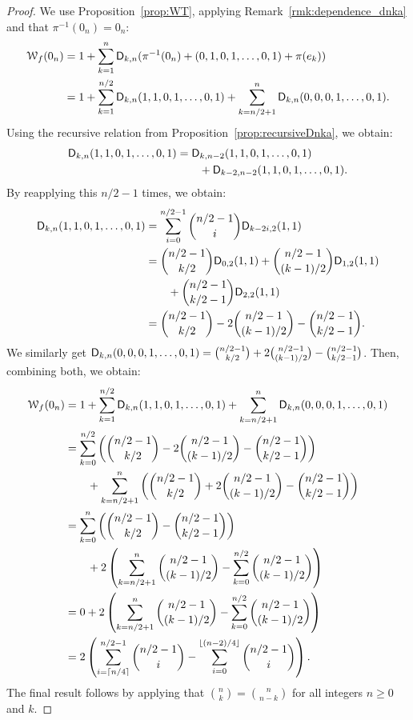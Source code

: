 \documentclass{llncs}
\begin{document}
\begin{proof}
	We use Proposition~\ref{prop:WT}, applying Remark~\ref{rmk:dependence_dnka} and that $\pi^{-1}(0_n)=0_n$:
	\begin{align*}
		\wt{f}(0_n)&=1+\sum_{k=1}^n\Dnka{n}{k}{\pi^{-1}(0_n)+(0,1,0,1,\ldots,0,1)+\pi(e_k)}\\
		&=1+\sum_{k=1}^{n/2}\Dnka{n}{k}{1,1,0,1,\ldots,0,1}+\sum_{k=n/2+1}^{n}\Dnka{n}{k}{0,0,0,1,\ldots,0,1}.
	\end{align*}
	Using the recursive relation from Proposition~\ref{prop:recursiveDnka}, we obtain:
	\begin{align*}
		\Dnka{n}{k}{1,1,0,1,\ldots,0,1}&=\Dnka{n-2}{k}{1,1,0,1,\ldots,0,1}\\
		&\qquad+\Dnka{n-2}{k-2}{1,1,0,1,\ldots,0,1}.
	\end{align*}
	By reapplying this $n/2-1$ times, we obtain:
	\begin{align*}
		\Dnka{n}{k}{1,1,0,1,\ldots,0,1}&=\sum_{i=0}^{n/2-1} \binom{n/2-1}{i} \Dnka{2}{k-2i}{1,1}\\
		&=\binom{n/2-1}{k/2} \Dnka{2}{0}{1,1}+ \binom{n/2-1}{(k-1)/2} \Dnka{2}{1}{1,1}\\
		&\qquad+ \binom{n/2-1}{k/2-1} \Dnka{2}{2}{1,1}\\
		&=\binom{n/2-1}{k/2}-2\binom{n/2-1}{(k-1)/2}-\binom{n/2-1}{k/2-1}.
	\end{align*}
	We similarly get $\Dnka{n}{k}{0,0,0,1,\ldots,0,1}=\binom{n/2-1}{k/2} +2 \binom{n/2-1}{(k-1)/2}-\binom{n/2-1}{k/2-1}$. Then, combining both, we obtain:
	\begin{align*}
		\wt{f}(0_n)&=1+\sum_{k=1}^{n/2}\Dnka{n}{k}{1,1,0,1,\ldots,0,1}+ \sum_{k=n/2+1}^{n}\Dnka{n}{k}{0,0,0,1,\ldots,0,1}\\
		&=\sum_{k=0}^{n/2} \left(\binom{n/2-1}{k/2} -2 \binom{n/2-1}{(k-1)/2}-\binom{n/2-1}{k/2-1}\right)\\
		&\qquad+\sum_{k=n/2+1}^{n}\left(\binom{n/2-1}{k/2}+2\binom{n/2-1}{(k-1)/2}-\binom{n/2-1}{k/2-1}\right)\\
		&=\sum_{k=0}^{n}\left( \binom{n/2-1}{k/2}-\binom{n/2-1}{k/2-1}\right)\\
		&\qquad+2\left(\sum_{k=n/2+1}^{n}\binom{n/2-1}{(k-1)/2}-\sum_{k=0}^{n/2}\binom{n/2-1}{(k-1)/2}\right)\\
		&=0+2\left(\sum_{k=n/2+1}^{n}\binom{n/2-1}{(k-1)/2}-\sum_{k=0}^{n/2} \binom{n/2-1}{(k-1)/2}\right)\\
		&=2\left(\sum_{i=\lceil n/4\rceil}^{n/2-1} \binom {n/2-1}{i} - \sum_{i=0}^{\lfloor(n-2)/4\rfloor} \binom{n/2-1}{i}\right).
	\end{align*}
	The final result follows by applying that $\binom{n}{k}=\binom{n}{n-k}$ for all integers $n\geq 0$ and $k$.
\end{proof}
\end{document}
